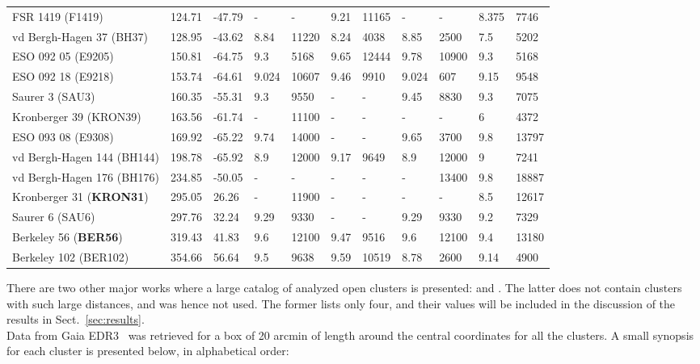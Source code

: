 \documentclass{aa}
\begin{document}
\begin{table}
\begin{tabular}{lllllllllll}
 FSR 1419 (F1419)   & 124.71 & -47.79    & -   & -   & 9.21  & 11165 & -   & -   & 8.375 & 7746  \\
 vd Bergh-Hagen 37 (BH37)    & 128.95 & -43.62    & 8.84  & 11220 & 8.24 
 & 4038  & 8.85  & 2500  & 7.5   & 5202  \\
 ESO 092 05 (E9205)  & 150.81 & -64.75    & 9.3   & 5168  & 9.65  & 12444 &
 9.78  & 10900 & 9.3   & 5168  \\
 ESO 092 18 (E9218)  & 153.74 & -64.61    & 9.024 & 10607 & 9.46  & 9910  &
 9.024 & 607   & 9.15  & 9548  \\
 Saurer 3 (SAU3)   & 160.35 & -55.31    & 9.3   & 9550  & -   & -   & 9.45  &
 8830 & 9.3   & 7075  \\
 Kronberger 39 (KRON39)    & 163.56 & -61.74    & -   & 11100 & -   & -   & -   &
 -   & 6     & 4372  \\
 ESO 093 08 (E9308)  & 169.92 & -65.22    & 9.74  & 14000 & -   & -   & 9.65  &
 3700  & 9.8   & 13797 \\
 vd Bergh-Hagen 144 (BH144)   & 198.78 & -65.92    & 8.9   & 12000 & 9.17
 & 9649  & 8.9   & 12000 & 9     & 7241  \\
 vd Bergh-Hagen 176 (BH176)   & 234.85 & -50.05    & -   & -   & -   & - 
 & -   & 13400 & 9.8   & 18887 \\
 Kronberger 31 (\textbf{KRON31})    & 295.05 & 26.26     & -   & 11900 & -   & -   & -   &
 -   & 8.5   & 12617 \\
 Saurer 6 (SAU6)   & 297.76 & 32.24     & 9.29  & 9330  & -   & -   & 9.29  &
 9330 & 9.2   & 7329  \\
 Berkeley 56 (\textbf{BER56})     & 319.43 & 41.83     & 9.6   & 12100 & 9.47  & 9516  &
 9.6 & 12100 & 9.4   & 13180 \\
 Berkeley 102 (BER102)    & 354.66 & 56.64     & 9.5   & 9638  & 9.59  & 10519 &
 8.78  & 2600  & 9.14  & 4900 \\
 \hline
 \end{tabular}
 \end{table}

 There are two other major works where a large catalog of analyzed open clusters
 is presented: \cite{Lui_2019} and \cite{Dias_2021}. The latter does not contain
 clusters with such large distances, and was hence not used. The former lists
 only four, and their values will be included in the discussion of the results
 in Sect.~\ref{sec:results}.\\

 Data from Gaia EDR3~\citep{Gaia_2016,Gaia_EDR3} was retrieved for a box of 20
 arcmin of length around the central coordinates for all the clusters. A small
 synopsis for each cluster is presented below, in alphabetical order:\\
\end{document}
